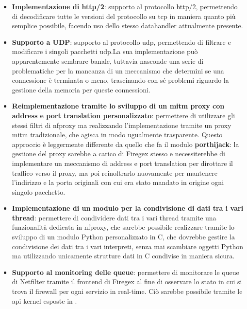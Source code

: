 \begin{itemize}
    \setlength{\itemsep}{2pt}
    \setlength{\parskip}{2pt}
    \item \textbf{Implementazione di \gls{http}/2}: supporto al protocollo \gls{http}/2, permettendo di decodificare tutte le versioni del protocollo su \gls{tcp} in maniera quanto più semplice possibile, facendo uso dello stesso datahandler attualmente presente.
    
    \item \textbf{Supporto a UDP}: supporto al protocollo \gls{udp}, permettendo di filtrare e modificare i singoli pacchetti \gls{udp}.\@ La sua implementazione può apparentemente sembrare banale, tuttavia nasconde una serie di problematiche per la mancanza di un meccanismo che determini se una connessione è terminata o meno, trascinando con sé problemi riguardo la gestione della memoria per queste connessioni.
    
    \item \textbf{Reimplementazione tramite lo sviluppo di un \gls{mitm} proxy con address e port translation personalizzato}: permettere di utilizzare gli stessi filtri di \gls{nfproxy} ma realizzando l'implementazione tramite un proxy \gls{mitm} tradizionale, che agisca in modo ugualmente trasparente. Questo approccio è leggermente differente da quello che fa il modulo \textbf{\gls{porthijack}}: la gestione del proxy sarebbe a carico di Firegex stesso e necessiterebbe di implementare un meccanismo di address e port translation per dirottare il traffico verso il proxy, ma poi reinoltrarlo nuovamente per mantenere l'indirizzo e la porta originali con cui era stato mandato in origine ogni singolo pacchetto.
    
    \item \textbf{Implementazione di un modulo per la condivisione di dati tra i vari thread}: permettere di condividere dati tra i vari thread tramite una funzionalità dedicata in \gls{nfproxy}, che sarebbe possibile realizzare tramite lo sviluppo di un modulo Python personalizzato in C, che dovrebbe gestire la condivisione dei dati tra i vari interpreti, senza mai scambiare oggetti Python ma utilizzando unicamente strutture dati in C condivise in maniera sicura.
    
    \item \textbf{Supporto al monitoring delle queue}: permettere di monitorare le queue di Netfilter tramite il frontend di Firegex al fine di osservare lo stato in cui si trova il firewall per ogni servizio in real-time. Ciò sarebbe possibile tramite le \gls{api} kernel esposte in .
\end{itemize}

